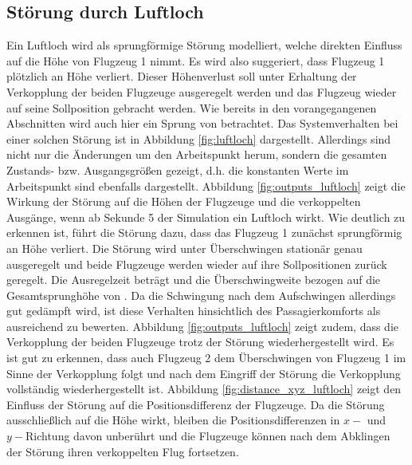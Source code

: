 \subsection{Störung durch Luftloch}
Ein Luftloch wird als sprungförmige Störung modelliert, welche direkten Einfluss auf die Höhe von Flugzeug 1 nimmt. Es wird also suggeriert, dass Flugzeug 1 plötzlich an Höhe verliert. Dieser Höhenverlust soll unter Erhaltung der Verkopplung der beiden Flugzeuge ausgeregelt werden und das Flugzeug wieder auf seine Sollposition gebracht werden. Wie bereits in den vorangegangenen Abschnitten wird auch hier ein Sprung von  betrachtet. Das Systemverhalten bei einer solchen Störung ist in Abbildung \ref{fig:luftloch} dargestellt. Allerdings sind nicht nur die Änderungen um den Arbeitspunkt herum, sondern die gesamten Zustands- bzw. Ausgangsgrößen gezeigt, d.h. die konstanten Werte im Arbeitspunkt sind ebenfalls dargestellt. Abbildung \ref{fig:outputs_luftloch} zeigt die Wirkung der Störung auf die Höhen der Flugzeuge und die verkoppelten Ausgänge, wenn ab Sekunde 5 der Simulation ein Luftloch wirkt. Wie deutlich zu erkennen ist, führt die Störung dazu, dass das Flugzeug 1 zunächst sprungförmig an Höhe verliert. Die Störung wird unter Überschwingen stationär genau ausgeregelt und beide Flugzeuge werden wieder auf ihre Sollpositionen zurück geregelt. Die Ausregelzeit beträgt  und die Überschwingweite  bezogen auf die Gesamtsprunghöhe von . Da die Schwingung nach dem Aufschwingen allerdings gut gedämpft wird, ist diese Verhalten hinsichtlich des Passagierkomforts als ausreichend zu bewerten. Abbildung \ref{fig:outputs_luftloch} zeigt zudem, dass die Verkopplung der beiden Flugzeuge trotz der Störung wiederhergestellt wird. Es ist gut zu erkennen, dass auch Flugzeug 2 dem Überschwingen von Flugzeug 1 im Sinne der Verkopplung folgt und  nach dem Eingriff der Störung die Verkopplung vollständig wiederhergestellt ist. Abbildung \ref{fig:distance_xyz_luftloch} zeigt den Einfluss der Störung auf die Positionsdifferenz der Flugzeuge. Da die Störung ausschließlich auf die Höhe wirkt, bleiben die Positionsdifferenzen in $x-$ und $y-$Richtung davon unberührt und die Flugzeuge können nach dem Abklingen der Störung ihren verkoppelten Flug fortsetzen.
